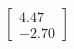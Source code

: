 \documentclass[preview]{standalone}
\begin{document}
\begin{align*}
\begin{bmatrix} 4.47 \\ -2.70 \end{bmatrix}
\end{align*}
\end{document}
